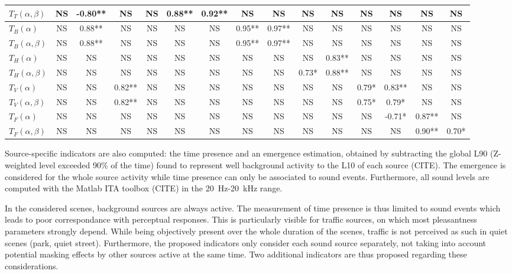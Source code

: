 \documentclass{article}
\begin{document}
\begin{sloppy}
\begin{table}[ht!]
{\begin{tabular}{ l | c c c c c c c c c c c c c c }
	$T_T(\alpha, \beta)$ & NS & -0.80** & NS & NS & 0.88** & 0.92** & NS & NS & NS & NS & NS & NS & NS & NS \\ \hline
	$T_B(\alpha)$ & NS & 0.88** & NS & NS & NS & NS & 0.95** & 0.97** & NS & NS & NS & NS & NS & NS \\
	$T_B(\alpha, \beta)$ & NS & 0.88** & NS & NS & NS & NS & 0.95** & 0.97** & NS & NS & NS & NS & NS & NS \\ \hline
	$T_H(\alpha)$ & NS & NS & NS & NS & NS & NS & NS & NS & NS & 0.83** & NS & NS & NS & NS \\
	$T_H(\alpha, \beta)$ & NS & NS & NS & NS & NS & NS & NS & NS & 0.73* & 0.88** & NS & NS & NS & NS \\ \hline
	$T_V(\alpha)$ & NS & NS & 0.82** & NS & NS & NS & NS & NS & NS & NS & 0.79* & 0.83** & NS & NS \\
	$T_V(\alpha, \beta)$ & NS & NS & 0.82** & NS & NS & NS & NS & NS & NS & NS & 0.75* & 0.79* & NS & NS \\ \hline
	$T_F(\alpha)$ & NS & NS & NS & NS & NS & NS & NS & NS & NS & NS & NS & -0.71* & 0.87** & NS \\
	$T_F(\alpha, \beta)$ & NS & NS & NS & NS & NS & NS & NS & NS & NS & NS & NS & NS & 0.90** & 0.70* \\ \hline
\end{tabular}
}
\end{table}

Source-specific indicators are also computed: the time presence and an emergence estimation, obtained by subtracting the global L90 (Z-weighted level exceeded 90\% of the time) found to represent well background activity to the L10 of each source (CITE). The emergence is considered for the whole source activity while time presence can only be associated to sound events. Furthermore, all sound levels are computed with the Matlab ITA toolbox (CITE) in the 20~Hz-20~kHz range.

In the considered scenes, background sources are always active. The measurement of time presence is thus limited to sound events which leads to poor correspondance with perceptual responses. This is particularly visible for traffic sources, on which most pleasantness parameters strongly depend. While being objectively present over the whole duration of the scenes, traffic is not perceived as such in quiet scenes (park, quiet street). Furthermore, the proposed indicators only consider each sound source separately, not taking into account potential masking effects by other sources active at the same time. Two additional indicators are thus proposed regarding these considerations.




\end{sloppy}
\end{document}
